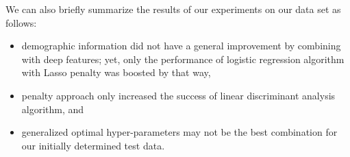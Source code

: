 We can also briefly summarize the results of our experiments on our data set as follows:
\begin{itemize}
    \item demographic information did not have a general improvement by combining with deep features; yet, only the performance of logistic regression algorithm with Lasso penalty was boosted by that way,
    \item penalty approach only increased the success of linear discriminant analysis algorithm, and
    \item generalized optimal hyper-parameters may not be the best combination for our initially determined test data.
\end{itemize}


